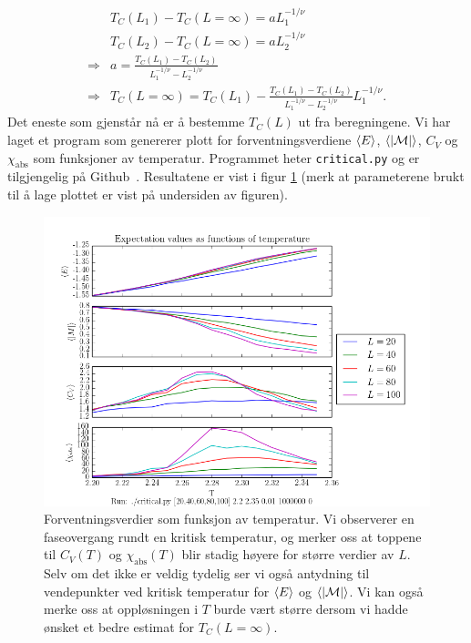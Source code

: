 \documentclass[11pt]{article}
\newcommand{\abs}[1]{|#1|}
\begin{document}
\begin{align}
  &T_C(L_1) - T_C(L=\infty) = aL_1^{-1/\nu}\\
  &T_C(L_2) - T_C(L=\infty) = aL_2^{-1/\nu}\\
\Rightarrow &a = \frac{ T_C(L_1) - T_C(L_2)} {L_1^{-1/\nu} -
  L_2^{-1/\nu}}\\
\Rightarrow &T_C(L=\infty) = T_C(L_1) - \frac{ T_C(L_1) - T_C(L_2)} {L_1^{-1/\nu} -
  L_2^{-1/\nu}}L_1^{-1/\nu}\label{eq:Tc-inf-scale-expression}.
\end{align}
Det eneste som gjenstår nå er å bestemme $T_C(L)$ ut fra
beregningene. Vi har laget et program som genererer plott for
forventningsverdiene $\langle E \rangle$, $\mean{\abs{\mathcal{M}}}$, $C_V$ og
$\chi_\text{abs}$ som funksjoner av temperatur. Programmet heter
\texttt{critical.py} og er tilgjengelig på
Github~\cite{github-repo}. Resultatene er vist i figur \ref{fig:critical-plot} (merk at
parameterene brukt til å lage plottet er vist på undersiden av
figuren). 

\begin{figure}[ht]
  \centering
  \includegraphics[scale=0.7]{../fig/critical.png}
  \caption{\label{fig:critical-plot} Forventningsverdier som funksjon
    av temperatur. Vi observerer en faseovergang rundt en kritisk
    temperatur, og merker oss at toppene til $C_V(T)$ og
    $\chi_\text{abs}(T)$ blir stadig høyere for større verdier av
    $L$. Selv om det ikke er veldig tydelig ser vi også antydning til
    vendepunkter ved kritisk temperatur for $\langle E \rangle$ og
    $\langle |\mathcal{M}| \rangle$. Vi kan også merke oss at oppløsningen i
    $T$ burde vært større dersom vi hadde ønsket et bedre estimat for $T_C(L=\infty)$.}
\end{figure}
\end{document}
